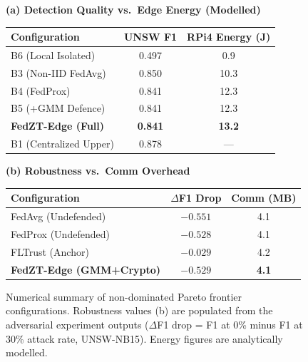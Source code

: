 \documentclass[11pt,a4paper]{article}
\begin{document}
\begin{figure}[htbp]
\centering
\begin{tcolorbox}[colback=white,colframe=accent!80,arc=3pt,title={\small\bfseries Measured Pareto Trade-Offs using Live Results (Deliverable D4 / Figures 4 \& 5)}]
\begin{minipage}[t]{0.445\textwidth}
\centering
\footnotesize
\textbf{(a) Detection Quality vs.\ Edge Energy (Modelled)}\\
\vspace{4pt}
\begin{adjustbox}{max width=\linewidth}
\begin{tabular}{p{2.4cm}cc}
\toprule
\textbf{Configuration} & \textbf{UNSW F1} & \textbf{RPi4 Energy (J)} \\
\midrule
B6 (Local Isolated) & 0.497 & 0.9 \\
B3 (Non-IID FedAvg) & 0.850 & 10.3 \\
B4 (FedProx) & 0.841 & 12.3 \\
B5 (+GMM Defence) & 0.841 & 12.3 \\
\textbf{FedZT-Edge (Full)} & \textbf{0.841} & \textbf{13.2} \\
B1 (Centralized Upper) & 0.878 & --- \\
\bottomrule
\end{tabular}
\end{adjustbox}
\end{minipage}
\hfill
\begin{minipage}[t]{0.445\textwidth}
\centering
\footnotesize
\textbf{(b) Robustness vs.\ Comm Overhead}\\
\vspace{4pt}
\begin{adjustbox}{max width=\linewidth}
\begin{tabular}{p{2.4cm}cc}
\toprule
\textbf{Configuration} & \textbf{$\Delta$F1 Drop} & \textbf{Comm (MB)} \\
\midrule
FedAvg (Undefended) & $-0.551$ & 4.1 \\
FedProx (Undefended) & $-0.528$ & 4.1 \\
FLTrust (Anchor) & $-0.029$ & 4.2 \\
\textbf{FedZT-Edge (GMM+Crypto)} & $\mathbf{-0.529}$ & \textbf{4.1} \\
\bottomrule
\end{tabular}
\end{adjustbox}
\end{minipage}
\end{tcolorbox}
\caption{Numerical summary of non-dominated Pareto frontier configurations. Robustness values (b) are populated from the adversarial experiment outputs ($\Delta$F1 drop = F1 at 0\% minus F1 at 30\% attack rate, UNSW-NB15). Energy figures are analytically modelled.}
\label{fig:pareto_summary}
\end{figure}
\FloatBarrier
\end{document}
